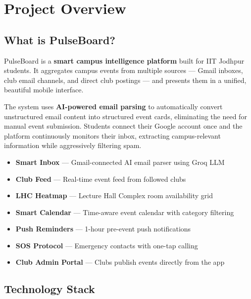 \documentclass[12pt,a4paper]{report}
\newenvironment{infobox}[1]{%
  \begin{tcolorbox}[
    enhanced, breakable,
    colback  = type!8,
    colframe = type!60,
    fonttitle= \bfseries\small,
    title    = {#1},
    left=6pt, right=6pt, top=4pt, bottom=4pt
  ]
}{%
  \end{tcolorbox}
}
\begin{document}
\tableofcontents
\newpage

\chapter{Project Overview}

\section{What is PulseBoard?}

PulseBoard is a \textbf{smart campus intelligence platform} built for IIT Jodhpur students. It aggregates campus events from multiple sources — Gmail inboxes, club email channels, and direct club postings — and presents them in a unified, beautiful mobile interface.

The system uses \textbf{AI-powered email parsing} to automatically convert unstructured email content into structured event cards, eliminating the need for manual event submission. Students connect their Google account once and the platform continuously monitors their inbox, extracting campus-relevant information while aggressively filtering spam.

\begin{infobox}{Core Capabilities}
\begin{itemize}[leftmargin=*]
  \item \textbf{Smart Inbox} — Gmail-connected AI email parser using Groq LLM
  \item \textbf{Club Feed} — Real-time event feed from followed clubs
  \item \textbf{LHC Heatmap} — Lecture Hall Complex room availability grid
  \item \textbf{Smart Calendar} — Time-aware event calendar with category filtering
  \item \textbf{Push Reminders} — 1-hour pre-event push notifications
  \item \textbf{SOS Protocol} — Emergency contacts with one-tap calling
  \item \textbf{Club Admin Portal} — Clubs publish events directly from the app
\end{itemize}
\end{infobox}

\section{Technology Stack}
\end{document}
